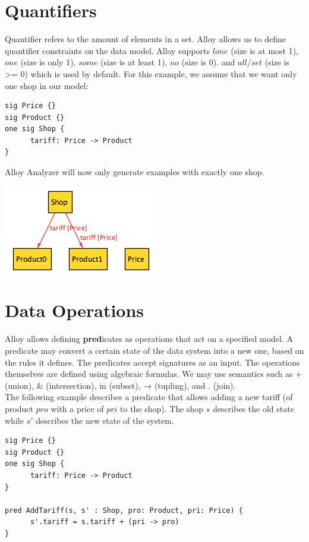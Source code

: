 \documentclass[oneside]{book}
\begin{document}
\section{Quantifiers}

Quantifier refers to the amount of elements in a set. Alloy allows us to define quantifier constraints on the data model. Alloy supports $lone$ (size is at most 1), $one$ (size is only 1), $some$ (size is at least 1), $no$ (size is 0). and $all/set$ (size is >= 0) which is used by default. For this example, we assume that we want only one shop in our model:

\begin{lstlisting}
sig Price {}
sig Product {}
one sig Shop {
	  tariff: Price -> Product
}
\end{lstlisting}

Alloy Analyzer will now only generate examples with exactly one shop. 

\begin{center}
\includegraphics[scale=0.6]{shop2}
\end{center}

\newpage

\section{Data Operations}
Alloy allows defining \textbf{pred}icates as operations that act on a specified model. A predicate may convert a certain state of the data system into a new one, based on the rules it defines. The predicates accept signatures as an input. The operations themselves are defined using algebraic formulas. We may use semantics such as + (union), \& (intersection), in (subset), → (tupling), and . (join).\\

The following example describes a predicate that allows adding a new tariff (of product $pro$ with a price of $pri$ to the shop). The shop $s$ describes the old state while $s'$ describes the new state of the system.

\begin{lstlisting}
sig Price {}
sig Product {}
one sig Shop {
	  tariff: Price -> Product
}

pred AddTariff(s, s' : Shop, pro: Product, pri: Price) {
	  s'.tariff = s.tariff + (pri -> pro)
}
\end{lstlisting}
\end{document}
